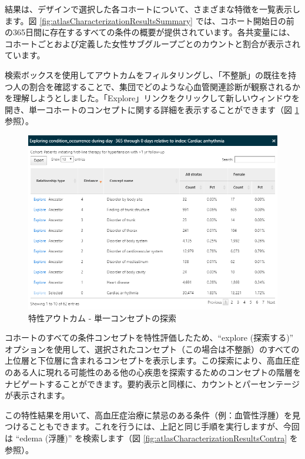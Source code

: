 \documentclass[
  11pt]{book}
\theoremstyle{definition}
\theoremstyle{definition}
\theoremstyle{definition}
\theoremstyle{definition}
\theoremstyle{remark}
\begin{document}
結果は、デザインで選択した各コホートについて、さまざまな特徴を一覧表示します。図 \ref{fig:atlasCharacterizationResultsSummary} では、コホート開始日の前の365日間に存在するすべての条件の概要が提供されています。各共変量には、コホートごとおよび定義した女性サブグループごとのカウントと割合が表示されています。

検索ボックスを使用してアウトカムをフィルタリングし、「不整脈」の既往を持つ人の割合を確認することで、集団でどのような心血管関連診断が観察されるかを理解しようとしました。「Explore」リンクをクリックして新しいウィンドウを開き、単一コホートのコンセプトに関する詳細を表示することができます（図 \ref{fig:atlasCharacterizationResultsExplore} 参照）。

\begin{figure}

{\centering \includegraphics[width=1\linewidth]{images/Characterization/atlasCharacterizationResultsExplore} 

}

\caption{特性アウトカム - 単一コンセプトの探索}\label{fig:atlasCharacterizationResultsExplore}
\end{figure}

コホートのすべての条件コンセプトを特性評価したため、``explore (探索する)'' オプションを使用して、選択されたコンセプト（この場合は不整脈）のすべての上位層と下位層に含まれるコンセプトを表示します。この探索により、高血圧症のある人に現れる可能性のある他の心疾患を探索するためのコンセプトの階層をナビゲートすることができます。要約表示と同様に、カウントとパーセンテージが表示されます。

この特性結果を用いて、高血圧症治療に禁忌のある条件（例：血管性浮腫）を見つけることもできます。これを行うには、上記と同じ手順を実行しますが、今回は ``edema (浮腫)'' を検索します（図 \ref{fig:atlasCharacterizationResultsContra} を参照）。
\end{document}
